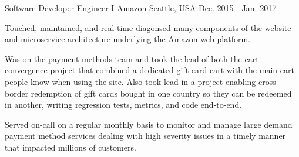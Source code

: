 \begin{cventries}
  \cventry
    {Software Developer Engineer I} %
    {Amazon} %
    {Seattle, USA} %
    {Dec. 2015 - Jan. 2017} %
    {
      \begin{cvitems} %
        \item {Touched, maintained, and real-time diagonsed many components of the website and microservice architecture underlying the Amazon web platform.}
        \item {Was on the payment methods team and took the lead of both the cart convergence project that combined a dedicated gift card cart with the main cart people know when using the site. Also took lead in a project enabling cross-border redemption of gift cards bought in one country so they can be redeemed in another, writing regression tests, metrics, and code end-to-end.}
        \item {Served on-call on a regular monthly basis to monitor and manage large demand payment method services dealing with high severity issues in a timely manner that impacted millions of customers.}
      \end{cvitems}
    }

\end{cventries}
